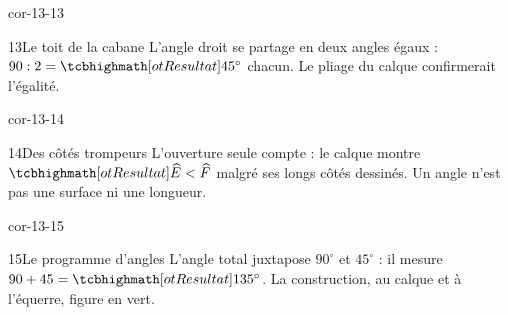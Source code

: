 \begin{blocLivre}{cor-13-13}\begin{corrige}{13}{Le toit de la cabane}
L’angle droit se partage en deux angles égaux : $90:2=\res{45^\circ}$ chacun. Le pliage du calque confirmerait l’égalité.
\label{fig-cor-13-13}
\end{corrige}\end{blocLivre}
\begin{blocLivre}{cor-13-14}\begin{corrige}{14}{Des côtés trompeurs}
L’ouverture seule compte : le calque montre $\res{\widehat E<\widehat F}$ malgré ses longs côtés dessinés. Un angle n’est pas une surface ni une longueur.
\label{fig-cor-13-14}
\end{corrige}\end{blocLivre}
\begin{blocLivre}{cor-13-15}\begin{corrige}{15}{Le programme d’angles}
L’angle total juxtapose $90^\circ$ et $45^\circ$ : il mesure $90+45=\res{135^\circ}$. La construction, au calque et à l’équerre, figure en vert.
\label{fig-cor-13-15}
\end{corrige}\end{blocLivre}
